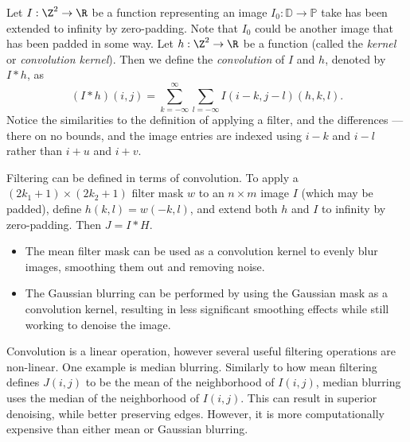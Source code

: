 \documentclass[12pt]{article}
\begin{document}
\begin{defn}
    Let $I: \Z^2 \to \R$ be a function representing an image $I_0: \mathbb{D} \to \mathbb{P}$ take has been extended to infinity by zero-padding. Note that $I_0$ could be another image that has been padded in some way. Let $h: \Z^2 \to \R$ be a function (called the \emph{kernel} or \emph{convolution kernel}). Then we define the \emph{convolution} of $I$ and $h$, denoted by $I * h$, as \[(I * h)(i, j) = \sum_{k=-\infty}^{\infty}\sum_{l=-\infty}I(i - k, j - l)(h, k, l).\] Notice the similarities to the definition of applying a filter, and the differences --- there on no bounds, and the image entries are indexed using $i - k$ and $i - l$ rather than $i + u$ and $i + v$.
\end{defn}

Filtering can be defined in terms of convolution. To apply a $(2k_1 + 1) \times (2k_2 + 1)$ filter mask $w$ to an $n \times m$ image $I$ (which may be padded), define $h(k, l) = w(-k, l)$, and extend both $h$ and $I$ to infinity by zero-padding. Then $J = I * H$.

\begin{exmp}\proofbreak
    \begin{itemize}
        \item The mean filter mask can be used as a convolution kernel to evenly blur images, smoothing them out and removing noise.
        \item The Gaussian blurring can be performed by using the Gaussian mask as a convolution kernel, resulting in less significant smoothing effects while still working to denoise the image.
    \end{itemize}
\end{exmp}

Convolution is a linear operation, however several useful filtering operations are non-linear. One example is median blurring. Similarly to how mean filtering defines $J(i, j)$ to be the mean of the neighborhood of $I(i, j)$, median blurring uses the median of the neighborhood of $I(i, j)$. This can result in superior denoising, while better preserving edges. However, it is more computationally expensive than either mean or Gaussian blurring.
\end{document}

